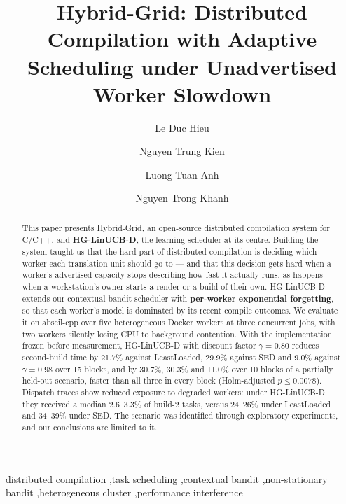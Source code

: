 \documentclass[final,5p,times,twocolumn]{elsarticle}
\begin{document}
\begin{frontmatter}

\title{Hybrid-Grid: Distributed Compilation with Adaptive Scheduling under Unadvertised Worker Slowdown}

\author[a]{Le Duc Hieu}
\author[a]{Nguyen Trung Kien}
\author[a]{Luong Tuan Anh}
\author[a]{Nguyen Trong Khanh}

\begin{abstract}
This paper presents Hybrid-Grid, an open-source distributed compilation system for C/C++, and \textbf{HG-LinUCB-D}, the learning scheduler at its centre. Building the system taught us that the hard part of distributed compilation is deciding which worker each translation unit should go to --- and that this decision gets hard when a worker's advertised capacity stops describing how fast it actually runs, as happens when a workstation's owner starts a render or a build of their own. HG-LinUCB-D extends our contextual-bandit scheduler with \textbf{per-worker exponential forgetting}, so that each worker's model is dominated by its recent compile outcomes. We evaluate it on abseil-cpp over five heterogeneous Docker workers at three concurrent jobs, with two workers silently losing CPU to background contention. With the implementation frozen before measurement, HG-LinUCB-D with discount factor $\gamma=0.80$ reduces second-build time by 21.7\% against LeastLoaded, 29.9\% against SED and 9.0\% against $\gamma=0.98$ over 15 blocks, and by 30.7\%, 30.3\% and 11.0\% over 10 blocks of a partially held-out scenario, faster than all three in every block (Holm-adjusted $p\le0.0078$). Dispatch traces show reduced exposure to degraded workers: under HG-LinUCB-D they received a median 2.6--3.3\% of build-2 tasks, versus 24--26\% under LeastLoaded and 34--39\% under SED. The scenario was identified through exploratory experiments, and our conclusions are limited to it.
\end{abstract}

\begin{keyword}
distributed compilation \sep task scheduling \sep contextual bandit \sep non-stationary bandit \sep heterogeneous cluster \sep performance interference
\end{keyword}

\end{frontmatter}
\end{document}
